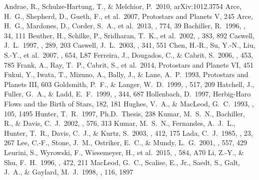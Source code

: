 \documentclass[twocolumn]{aastex61}
\begin{document}
\begin{thebibliography}{}
 Andrae, R., Schulze-Hartung, T., \& Melchior, P.\ 2010, arXiv:1012.3754
 Arce, H.~G., Shepherd, D., Gueth, F., et al.\ 2007, Protostars and Planets V, 245 
 Arce, H.~G., Mardones, D., Corder, S.~A., et al.\ 2013, \apj, 774, 39
 Bachiller, R.\ 1996, \araa, 34, 111 
 Beuther, H., Schilke, P., Sridharan, T.~K., et al.\ 2002, \aap, 383, 892
 Caswell, J.~L.\ 1997, \mnras, 289, 203 
 Caswell, J.~L.\ 2003, \mnras, 341, 551 
 Chen, H.-R., Su, Y.-N., Liu, S.-Y., et al.\ 2007, \apjl, 654, L87 
 Ferreira, J., Dougados, C., \& Cabrit, S.\ 2006, \aap, 453, 785 
 Frank, A., Ray, T.~P., Cabrit, S., et al.\ 2014, Protostars and Planets VI, 451
 Fukui, Y., Iwata, T., Mizuno, A., Bally, J., \& Lane, A.~P.\ 1993, Protostars and Planets III, 603
 Goldsmith, P.~F., \& Langer, W.~D.\ 1999, \apj, 517, 209
 Hatchell, J., Fuller, G.~A., \& Ladd, E.~F.\ 1999, \aap, 344, 687 
 Hollenbach, D.\ 1997, Herbig-Haro Flows and the Birth of Stars, 182, 181 
 Hughes, V.~A., \& MacLeod, G.~C.\ 1993, \aj, 105, 1495
 Hunter, T.~R.\ 1997, Ph.D.~Thesis, 238 
 Kumar, M.~S.~N., Bachiller, R., \& Davis, C.~J.\ 2002, \apj, 576, 313 
 Kumar, M.~S.~N., Fernandes, A.~J.~L., Hunter, T.~R., Davis, C.~J., \& Kurtz, S.\ 2003, \aap, 412, 175 
 Lada, C.~J.\ 1985, \araa, 23, 267 
 Lee, C.-F., Stone, J.~M., Ostriker, E.~C., \& Mundy, L.~G.\ 2001, \apj, 557, 429 
 Leurini, S., Wyrowski, F., Wiesemeyer, H., et al.\ 2015, \aap, 584, A70 
 Li, Z.-Y., \& Shu, F.~H.\ 1996, \apj, 472, 211
 MacLeod, G.~C., Scalise, E., Jr., Saedt, S., Galt, J.~A., \& Gaylard, M.~J.\ 1998, \aj, 116, 1897 

\end{thebibliography}
\end{document}
